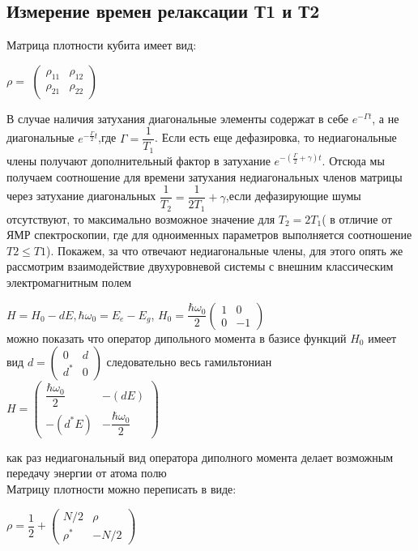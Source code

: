 \documentclass[12pt, a4paper, openany]{book}
\begin{document}
\subsection{Измерение времен релаксации Т1 и Т2}
Матрица плотности кубита имеет вид:
\begin{center}
$\rho = $
$\begin{pmatrix} \rho_{11}&\rho_{12}\\  \rho_{21}& \rho_{22}\end{pmatrix}$
\end{center}
В случае наличия затухания диагональные элементы содержат в себе $e^{-\Gamma t}$, а не диагональные $e^{-\frac{\Gamma}{2}t}$,где $\Gamma=\dfrac{1}{T_1}$. Если есть еще дефазировка, то недиагональные члены получают дополнительный фактор в затухание $e^{-(\frac{\Gamma}{2}+\gamma)t}$. Отсюда мы получаем соотношение для времени затухания недиагональных членов матрицы через затухание диагональных $\dfrac{1}{T_2}=\dfrac{1}{2 T_1}+\gamma $,если дефазирующие шумы отсутствуют, то максимально возможное значение для $T_2=2T_1$( в отличие от ЯМР спектроскопии, где для одноименных параметров выполняется соотношение $T2 \leq T1$).
Покажем, за что отвечают недиагональные члены, для этого опять же рассмотрим взаимодействие двухуровневой системы с внешним классическим электромагнитным полем
\begin{center}
$H=H_0-dE, \hbar\omega_0=E_e-E_g$,
$H_0=\dfrac{\hbar\omega_0}{2}\begin{pmatrix} 1&0\\  0& -1\end{pmatrix}$\\
можно показать что оператор дипольного момента в базисе  функций $H_0$ имеет вид $d=\begin{pmatrix} 0&d\\  d^*& 0\end{pmatrix}$ следовательно весь гамильтониан 
$H=\begin{pmatrix} \dfrac{\hbar\omega_0}{2}&-(dE)\\  -(d^*E)& -\dfrac{\hbar\omega_0}{2}\end{pmatrix}$
\end{center}
как раз недиагональный вид оператора диполного момента делает возможным передачу энергии от атома полю\\
Матрицу плотности можно переписать в виде:
\begin{center}
$\rho = \dfrac{1}{2}+\begin{pmatrix} N/2&\rho\\  \rho^*& -N/2 \end{pmatrix}$
\end{center}
\end{document}
